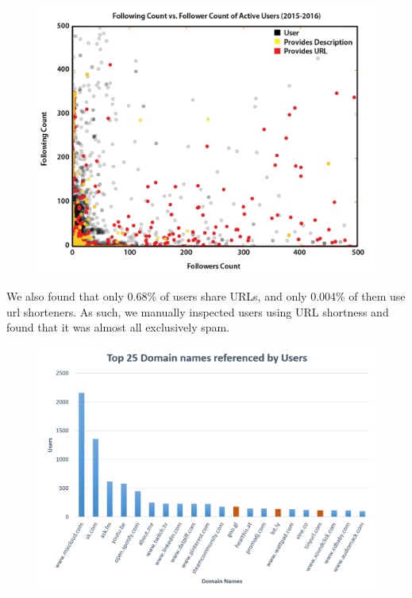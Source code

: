 \documentclass[11pt,twocolumn]{article} %
\begin{document}
\begin{figure}
\centering
\includegraphics[width=1.0\linewidth]{images/Following_vs_Followers_w_description_and_url}
\caption{}
\label{fig:Following_vs_Followers_w_description_and_url}
\end{figure}

\par We also found that only 0.68\% of users share URLs, and only 0.004\% of them use url shorteners. As such, we manually inspected users using URL shortness and found that it was almost all exclusively spam.

\begin{figure}
	\centering
	\includegraphics[width=1.0\linewidth]{images/domain_histogram}
	\caption{}
	\label{fig:domain_histogram}
	\end{figure}
\end{document}
